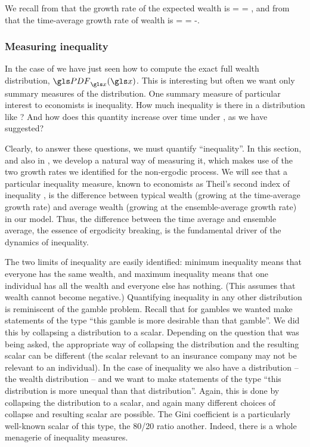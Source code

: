 We recall from  that the growth rate of the expected wealth is
\be
\gex = \frac{\gd\ln\ave{\x}}{\gd\t} = \gmu,
\ee
and from  that the time-average growth rate of wealth is
\be
\gt = \frac{\gd\ave{\ln \x}}{\gd\t} = \gmu-.
\ee


\subsubsection{Measuring inequality}
In the case of \GBM we have just seen how to 
compute the exact full wealth distribution, $\PDF_\x(\x)$. This is interesting but often we want only summary measures of the distribution. One summary measure of particular interest to economists is inequality. How much inequality is there in a distribution like ? And how does this quantity increase over time under \GBM, as we have suggested?

Clearly, to answer these questions, we must quantify ``inequality''. In this section, and also in \cite{AdamouPeters2016}, we develop a natural way of measuring it, which makes use of the two growth rates we identified for the non-ergodic process. We will see that a particular inequality measure, known to economists as Theil's second index of inequality \cite{Theil1967}, is the difference between typical wealth (growing at the time-average growth rate) and average wealth (growing at the ensemble-average growth rate) in our model. Thus, the difference between the time average and ensemble average, the essence of ergodicity breaking, is the fundamental driver of the dynamics of inequality.

The two limits of inequality are easily identified: minimum inequality means that everyone 
has the same wealth, and maximum inequality means that one individual has all the 
wealth and everyone else has nothing. (This assumes that wealth cannot become 
negative.) Quantifying inequality in any other distribution is reminiscent of the gamble 
problem. Recall that for gambles we wanted make statements of the type ``this gamble 
is more desirable than that gamble''. We did this by collapsing a distribution to a 
scalar. Depending on the question that was being asked, 
the appropriate way of collapsing the distribution and the resulting scalar can be different 
(the scalar relevant to an insurance company may not be relevant to an individual). 
In the case of inequality we also have a distribution -- the wealth distribution -- and we 
want to make statements of the type ``this distribution is more unequal than that 
distribution''. Again, this is done by collapsing the distribution to a scalar, and again 
many different choices of collapse and resulting scalar are possible. The Gini 
coefficient is a particularly well-known scalar of this type, the 80/20 ratio another. Indeed, there is a whole menagerie of inequality measures.

